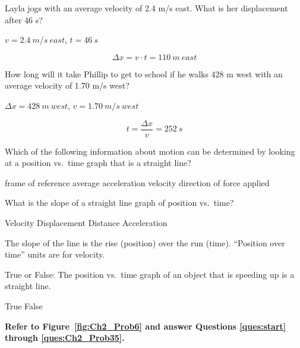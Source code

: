 \documentclass[]{exam}
\begin{document}
\begin{questions}
\begin{questions}
\question
Layla jogs with an average velocity of 2.4 m/s east. What is her displacement after 46 s?

\begin{solution}
    $v = \SI{2.4}{m/s\ east}$, $t = \SI{46}{s}$

\begin{equation*}
    \Delta{x} = v \cdot t = \SI{110}{m\ east}
\end{equation*}
\end{solution}


\question
How long will it take Phillip to get to school if he walks 428 m west with an average velocity of 1.70 m/s west?

\begin{solution}
    $\Delta{x} = \SI{428}{m\ west}$, $v = \SI{1.70}{m/s\ west}$

\begin{equation*}
    t = \frac{\Delta{x}}{v} = \SI{252}{s}
\end{equation*}
\end{solution}


\question
Which of the following information about motion can be determined by looking at a position vs.~time graph that is a straight line?

\begin{choices}
\choice frame of reference
\choice average acceleration
\CorrectChoice velocity
\choice direction of force applied
\end{choices}

\question
What is the slope of a straight line graph of position vs.~time?

\begin{choices}
\CorrectChoice Velocity
\choice Displacement
\choice Distance
\choice Acceleration
\end{choices}

\begin{solution}
The slope of the line is the rise (position) over the run (time). ``Position over time'' units are for velocity.
\end{solution}


\question
True or False: The position vs.~time graph of an object that is speeding up is a straight line.

\begin{choices}
\choice True
\CorrectChoice False
\end{choices}



\begin{EnvUplevel}
\textbf{Refer to Figure~\ref{fig:Ch2_Prob6} and answer Questions \ref{ques:start} through \ref{ques:Ch2_Prob35}.}
\end{EnvUplevel}



\end{questions}
\end{questions}
\end{document}
